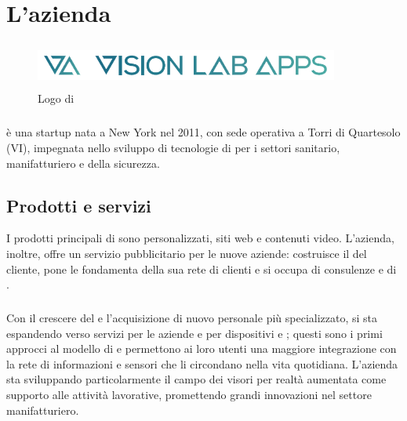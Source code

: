 \chapter{L'azienda\label{cap:lazienda}}
\begin{figure}[H]
   \begin{center}
      \includegraphics[width=10cm,height=1.5cm,keepaspectratio]{immagini/vla-logo}
   \end{center}
   \caption{Logo di \nomeAziendaComm{}}\label{logovla}
\end{figure}
\paragraph*{} \nomeAziendaComm{} è una startup nata a New York nel 2011, con sede operativa a Torri di Quartesolo (VI), impegnata nello sviluppo di tecnologie di  per i settori sanitario, manifatturiero e della sicurezza.

\section{Prodotti e servizi}
I prodotti principali di \nomeAzienda{} sono  personalizzati, siti web e contenuti video. L'azienda, inoltre, offre un servizio pubblicitario per le nuove aziende: costruisce il  del cliente, pone le fondamenta della sua rete di clienti e si occupa di consulenze e di .
\paragraph*{}
Con il crescere del  e l'acquisizione di nuovo personale più specializzato, \nomeAzienda{} si sta espandendo verso servizi  per le aziende e  per dispositivi  e ; questi sono i primi approcci al modello di  e permettono ai loro utenti una maggiore integrazione con la rete di informazioni e sensori che li circondano nella vita quotidiana. L'azienda sta sviluppando particolarmente il campo dei visori per realtà aumentata come supporto alle attività lavorative, promettendo grandi innovazioni nel settore manifatturiero.

